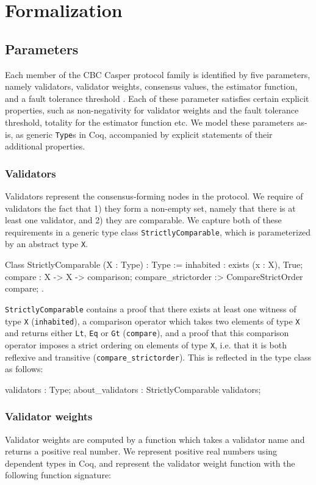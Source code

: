\documentclass[runningheads]{llncs}
\begin{document}
\section{Formalization}
\label{sec:formalization}

\subsection{Parameters}
Each member of the CBC Casper protocol family is identified by five parameters, namely validators, validator weights, consensus values, the estimator function, and a fault tolerance threshold \cite{CBCfull}. Each of these parameter satisfies certain explicit properties, such as non-negativity for validator weights and the fault tolerance threshold, totality for the estimator function etc. We model these parameters as-is, as generic \verb|Type|s in Coq, accompanied by explicit statements of their additional properties.

\subsubsection{Validators}
Validators represent the consensus-forming nodes in the protocol. We require of validators the fact that 1) they form a non-empty set, namely that there is at least one validator, and 2) they are comparable. We capture both of these requirements in a generic type class \verb|StrictlyComparable|, which is parameterized by an abstract type \verb|X|.
\begin{coq}
	Class StrictlyComparable (X : Type) : Type :=
	{
		inhabited : exists (x : X), True;
		compare : X -> X -> comparison;
		compare_strictorder :> CompareStrictOrder compare;
	}.
\end{coq}
\verb|StrictlyComparable| contains a proof that there exists at least one witness of type \verb|X| (\verb|inhabited|), a comparison operator which takes two elements of type \verb|X| and returns either \verb|Lt|, \verb|Eq| or \verb|Gt| (\verb|compare|), and a proof that this comparison operator imposes a strict ordering on elements of type \verb|X|, i.e. that it is both reflexive and transitive (\verb|compare_strictorder|).
This is reflected in the type class as follows:
\begin{coq}
	validators : Type;
	about_validators : StrictlyComparable validators;
\end{coq}
\subsubsection{Validator weights}
Validator weights are computed by a function which takes a validator name and returns a positive real number. We represent positive real numbers using dependent types in Coq, and represent the validator weight function with the following function signature:
\end{document}
